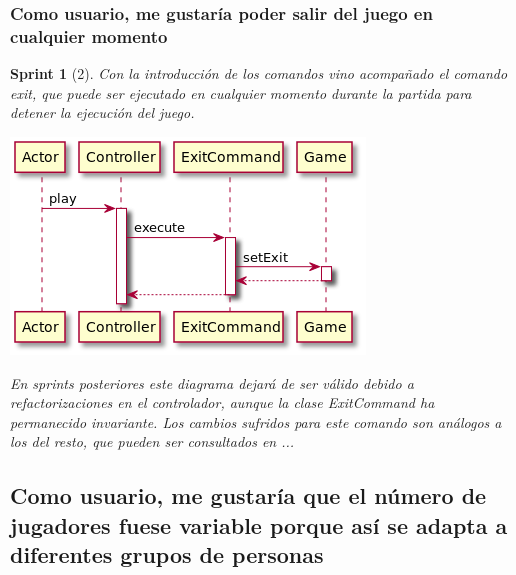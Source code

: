\documentclass{article}
\theoremstyle{break}
\newtheorem*{sprint}{Sprint}
\begin{document}
\subsubsection{Como usuario, me gustaría poder salir del juego en cualquier momento}
\begin{sprint}[2]
Con la introducción de los comandos vino acompañado el comando exit, que puede ser ejecutado en cualquier momento durante la partida para detener la ejecución del juego.

\begin{center}
\includegraphics[scale=0.5]{exit-sprint2.png}
\end{center}

En sprints posteriores este diagrama dejará de ser válido debido a refactorizaciones en el controlador, aunque la clase ExitCommand ha permanecido invariante. Los cambios sufridos para este comando son análogos a los del resto, que pueden ser consultados en ... %
\end{sprint}

\subsection{Como usuario, me gustaría que el número de jugadores fuese variable porque así se adapta a diferentes grupos de personas}
\end{document}
